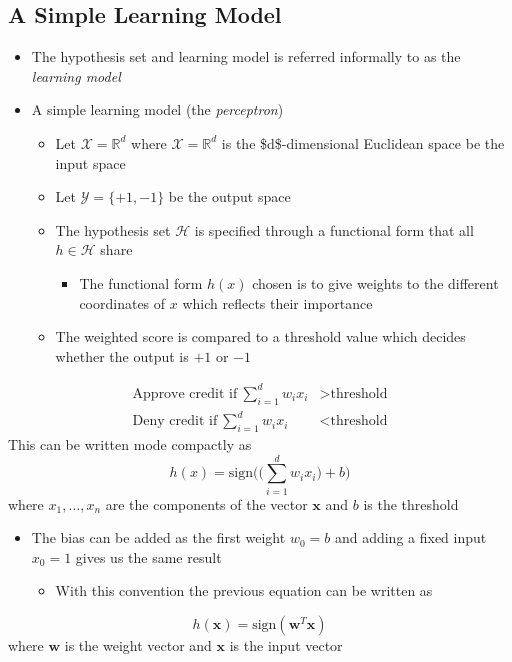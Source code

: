 \documentclass[11pt]{article}
\begin{document}
\subsection{A Simple Learning Model}
\label{sec:orgb028d84}
\begin{itemize}
\item The hypothesis set and learning model is referred informally to as the \emph{learning model}

\item A simple learning model (the \emph{perceptron})
\begin{itemize}
\item Let \(\mathcal X = \mathbb R ^d\) where \(\mathcal X = \mathbb R ^d\) is the \$d\$-dimensional Euclidean space be the input space
\item Let \(\mathcal Y = \{+1, -1\}\) be the output space
\item The hypothesis set \(\mathcal H\) is specified through a functional form that all \(h \in \mathcal H\) share
\begin{itemize}
\item The functional form \(h(x)\) chosen is to give weights to the different coordinates of \(x\) which reflects their importance
\end{itemize}
\item The weighted score is compared to a threshold value which decides whether the output is \(+1\) or \(-1\)
\end{itemize}
\end{itemize}
\begin{equation}
  \begin{split} 
    \text{Approve credit if} \ \sum_{i=1}^d w_ix_i &> \text{threshold} \\
    \text{Deny credit if} \ \sum_{i=1}^d w_ix_i &< \text{threshold}
  \end{split}
\end{equation}
This can be written mode compactly as 
\begin{equation}
  h(x) = \text{sign} \bigg( \bigg( \sum_{i=1}^d w_ix_i \bigg) + b \bigg)
\end{equation}
where \(x_1, \dots, x_n\) are the components of the vector \(\pmb x\) and \(b\) is the threshold

\begin{itemize}
\item The bias can be added as the first weight \(w_0 = b\) and adding a fixed input \(x_0 = 1\) gives us the same result
\begin{itemize}
\item With this convention the previous equation can be written as
\end{itemize}
\end{itemize}
\begin{equation}
  h(\pmb x) = \text{sign}(\pmb w^T \pmb x)
\end{equation}
where \(\pmb w\) is the weight vector and \(\pmb x\) is the input vector
\end{document}
